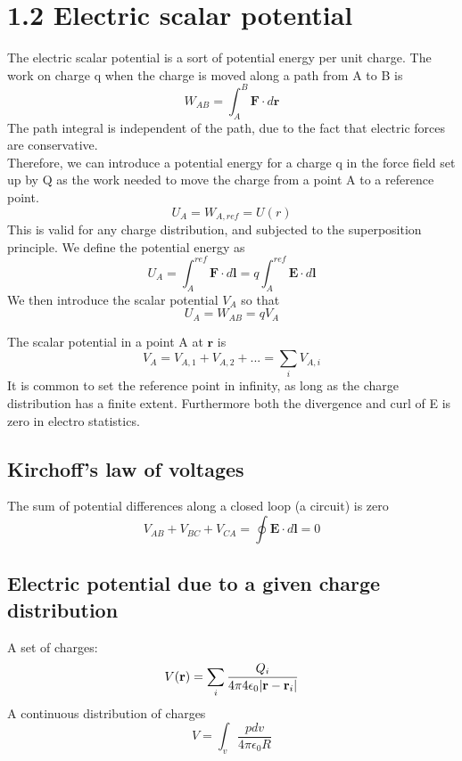 \documentclass[
12pt, reprint, aip, onecolumn, notitlepage
]{revtex4-1}
\begin{document}
\section{1.2 Electric scalar potential}
The electric scalar potential is a sort of potential energy per unit charge. 
The work on charge q when the charge is moved along a path from A to B is
\begin{equation}
	W_{AB} = \int_{A}^{B}\mathbf{F}\cdot d\mathbf{r} 
\end{equation}
The path integral is independent of the path, due to the fact that electric forces are conservative. \\
Therefore, we can introduce a potential energy for a charge q in the force field set up by Q as the work needed to move the charge from a point A to a reference point.
\begin{equation}
	U_A = W_{A, ref} = U(r)
\end{equation}
This is valid for any charge distribution, and subjected to the superposition principle. We define the potential energy as 
\begin{equation}
U_A = \int_{A}^{ref}\mathbf{F}\cdot d\mathbf{l} =  q\int_{A}^{ref}\mathbf{E}\cdot d\mathbf{l} 
\end{equation}
We then introduce the scalar potential $V_A$ so that
\begin{equation}
	U_A = W_{AB} = qV_A
\end{equation}

The scalar potential in a point A at $\mathbf{r}$ is 
\begin{equation}
	V_A = V_{A,1} +V_{A,2} + ... = \sum_i V_{A,i}
\end{equation}
It is common to set the reference point in infinity, as long as the charge distribution has a finite extent.
Furthermore both the divergence and curl of E is zero in electro statistics.
\subsection{Kirchoff's law of voltages}
The sum of potential differences along a closed loop (a circuit) is zero
\begin{equation}
	V_{AB} + V_{BC} + V_{CA} = \oint\mathbf{E}\cdot d \mathbf{l} = 0
\end{equation} 
\subsection{Electric potential due to a given charge distribution}
A set of charges:
\begin{equation}
	V(\mathbf{r}) = \sum_i\dfrac{Q_i}{4\pi4\epsilon_0\abs{\mathbf{r}-\mathbf{r}_i}}
\end{equation}
A continuous distribution of charges
\begin{equation}
	V = \int_v \dfrac{pdv}{4\pi\epsilon_0R}
\end{equation}
\end{document}
